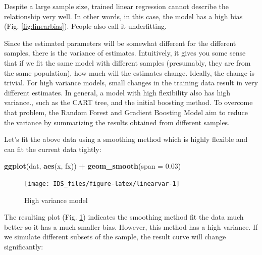 \documentclass[12pt,]{krantz}
\newenvironment{Shaded}{\begin{snugshade}}{\end{snugshade}}
\newcommand{\KeywordTok}[1]{\textcolor[rgb]{0.13,0.29,0.53}{\textbf{#1}}}
\newcommand{\DataTypeTok}[1]{\textcolor[rgb]{0.13,0.29,0.53}{#1}}
\newcommand{\FloatTok}[1]{\textcolor[rgb]{0.00,0.00,0.81}{#1}}
\newcommand{\StringTok}[1]{\textcolor[rgb]{0.31,0.60,0.02}{#1}}
\newcommand{\OperatorTok}[1]{\textcolor[rgb]{0.81,0.36,0.00}{\textbf{#1}}}
\newcommand{\NormalTok}[1]{#1}
\theoremstyle{definition}
\theoremstyle{definition}
\theoremstyle{definition}
\theoremstyle{remark}
\begin{document}
Despite a large sample size, trained linear regression cannot describe
the relationship very well. In other words, in this case, the model has
a high bias (Fig. \ref{fig:linearbias}). People also call it
underfitting.

Since the estimated parameters will be somewhat different for the
different samples, there is the variance of estimates. Intuitively, it
gives you some sense that if we fit the same model with different
samples (presumably, they are from the same population), how much will
the estimates change. Ideally, the change is trivial. For high variance
models, small changes in the training data result in very different
estimates. In general, a model with high flexibility also has high
variance., such as the CART tree, and the initial boosting method. To
overcome that problem, the Random Forest and Gradient Boosting Model aim
to reduce the variance by summarizing the results obtained from
different samples.

Let's fit the above data using a smoothing method which is highly
flexible and can fit the current data tightly:

\begin{Shaded}
\begin{Highlighting}[]
\KeywordTok{ggplot}\NormalTok{(dat, }\KeywordTok{aes}\NormalTok{(x, fx)) }\OperatorTok{+}\StringTok{ }\KeywordTok{geom_smooth}\NormalTok{(}\DataTypeTok{span =} \FloatTok{0.03}\NormalTok{)}
\end{Highlighting}
\end{Shaded}

\begin{figure}

{\centering \texttt{[image: IDS\_files/figure-latex/linearvar-1]} 

}

\caption{High variance model}\label{fig:linearvar}
\end{figure}

The resulting plot (Fig. \ref{fig:linearvar}) indicates the smoothing
method fit the data much better so it has a much smaller bias. However,
this method has a high variance. If we simulate different subsets of the
sample, the result curve will change significantly:
\end{document}
